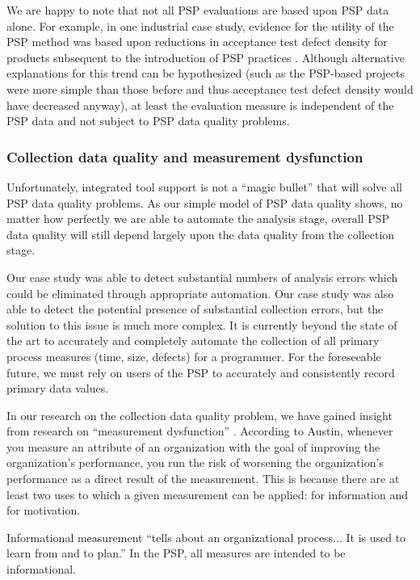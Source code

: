 We are happy to note that not all PSP evaluations are based upon PSP data
alone. For example, in one industrial case study, evidence for the utility
of the PSP method was based upon reductions in acceptance test defect
density for products subsequent to the introduction of PSP practices
\cite{Ferguson97}.  Although alternative explanations for this trend can be
hypothesized (such as the PSP-based projects were more simple than those
before and thus acceptance test defect density would have decreased
anyway), at least the evaluation measure is independent of the PSP data and
not subject to PSP data quality problems.

\subsubsection{Collection data quality and measurement dysfunction}
\label{measurement-dysfunction}

Unfortunately, integrated tool support is not a ``magic bullet'' that will
solve all PSP data quality problems.  As our simple model of PSP data
quality shows, no matter how perfectly we are able to automate the analysis
stage, overall PSP data quality will still depend largely upon the data
quality from the collection stage.

Our case study was able to detect substantial numbers of analysis errors
which could be eliminated through appropriate automation.  Our case study
was also able to detect the potential presence of substantial collection
errors, but the solution to this issue is much more complex.  It is
currently beyond the state of the art to accurately and completely automate
the collection of all primary process measures (time, size, defects) for a
programmer.  For the foreseeable future, we must rely on users of the PSP
to accurately and consistently record primary data values.  

In our research on the collection data quality problem, we have gained
insight from research on ``measurement dysfunction'' \cite{Austin96}.
According to Austin, whenever you measure an attribute of an organization
with the goal of improving the organization's performance, you run the risk
of worsening the organization's performance as a direct result of the
measurement.  This is because there are at least two uses to which a given
measurement can be applied: for information and for motivation.

Informational measurement ``tells about an organizational process... It is
used to learn from and to plan.''  In the PSP, all measures are intended to
be informational.

